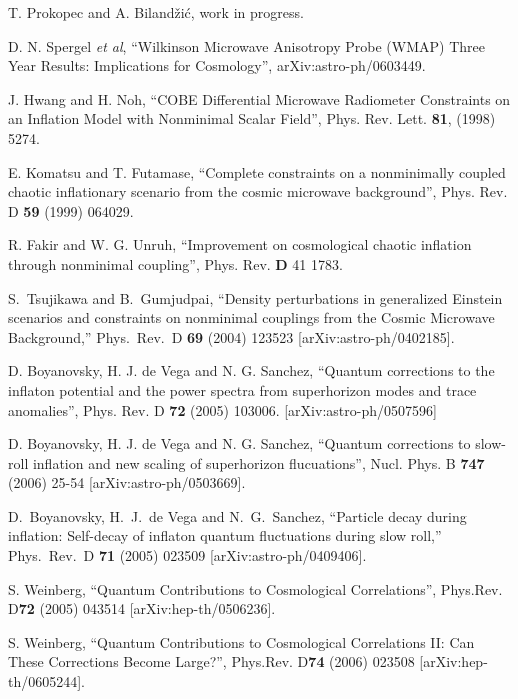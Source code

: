 \documentclass[aps,12pt,superscriptaddress,preprintnumbers,
                secnumarabic,nofootinbib,showpacs]{revtex4}
\begin{document}
 \begin{thebibliography}{999}

 T. Prokopec and A. Biland\v{z}i\'c,
 work in progress.

 D. N. Spergel \textit{et al}, ``Wilkinson Microwave Anisotropy Probe (WMAP)
Three Year Results: Implications for Cosmology'',
arXiv:astro-ph/0603449.

 J. Hwang and H. Noh, ``COBE Differential Microwave Radiometer Constraints on an Inflation Model
with Nonminimal Scalar Field'', Phys. Rev. Lett. \textbf{81},
(1998) 5274.

 E. Komatsu and T. Futamase, ``Complete constraints on a nonminimally coupled chaotic inflationary scenario
from the cosmic microwave background'', Phys. Rev. D \textbf{59}
(1999) 064029.

 R. Fakir and W. G. Unruh, 
``Improvement on cosmological chaotic inflation through nonminimal coupling'',
 Phys. Rev. \textbf{D} 41 1783.

  S.~Tsujikawa and B.~Gumjudpai,
  ``Density perturbations in generalized Einstein scenarios and constraints on
  nonminimal couplings from the Cosmic Microwave Background,''
  Phys.\ Rev.\  D {\bf 69} (2004) 123523
  [arXiv:astro-ph/0402185].

 D. Boyanovsky, H. J. de
Vega and N. G. Sanchez, ``Quantum corrections to the inflaton
potential and the power spectra from superhorizon modes and trace
anomalies'', Phys. Rev. D \textbf{72} (2005) 103006.
[arXiv:astro-ph/0507596]

 D. Boyanovsky, H. J. de
Vega and N. G. Sanchez, ``Quantum corrections to slow-roll
inflation and new scaling of superhorizon flucuations'', Nucl.
Phys. B \textbf{747} (2006) 25-54 [arXiv:astro-ph/0503669].

  D.~Boyanovsky, H.~J.~de Vega and N.~G.~Sanchez,
  ``Particle decay during inflation: Self-decay of inflaton quantum
  fluctuations during slow roll,''
  Phys.\ Rev.\  D {\bf 71} (2005) 023509
  [arXiv:astro-ph/0409406].

 S. Weinberg, ``Quantum Contributions to Cosmological
Correlations'', Phys.Rev. D\textbf{72} (2005) 043514
[arXiv:hep-th/0506236].

 S. Weinberg, ``Quantum Contributions to Cosmological Correlations II: Can These Corrections Become
Large?'', Phys.Rev. D\textbf{74} (2006) 023508
[arXiv:hep-th/0605244].


\end{thebibliography}
\end{document}
